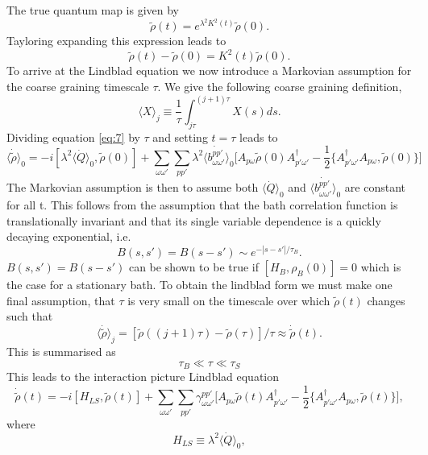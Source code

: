 \documentclass[10pt]{article}
\numberwithin{equation}{section}
\begin{document}
The true quantum map is given by 
\begin{equation}
\tilde{\rho}(t) = e^{\lambda^{2}K^{2}(t)}\tilde{\rho}(0).
\end{equation}
Tayloring expanding this expression leads to 
\begin{equation} \label{eq:7}
\tilde{\rho}(t)-\tilde{\rho}(0) = K^{2}(t)\tilde{\rho}(0).
\end{equation}
To arrive at the Lindblad equation we now introduce a Markovian assumption for the coarse graining timescale $\tau$. We give the following coarse graining definition,
\begin{equation}
\langle X \rangle_{j} \equiv \frac{1}{\tau} \int_{j\tau}^{(j+1)\tau}X(s)ds.
\end{equation}
Dividing equation \ref{eq:7} by $\tau$ and setting $t=\tau$ leads to 
\begin{equation}
\langle \dot{\tilde{\rho}} \rangle_{0} =  -i[\lambda^{2}\langle \dot{Q} \rangle_{0} ,\tilde{\rho}(0)] + \sum_{\omega\omega '}\sum_{pp'}\lambda^{2} \langle \dot{b_{\omega\omega '}^{pp'}} \rangle_{0} \bigg[A_{p\omega}\tilde{\rho}(0)A_{p'\omega '}^{\dagger} - \frac{1}{2}\{A_{p'\omega'}^{\dagger}A_{p\omega},\tilde{\rho}(0)\}\bigg]
\end{equation}
The Markovian assumption is then to assume both $\langle \dot{Q} \rangle_{0}$ and  $\langle \dot{b_{\omega\omega '}^{pp'}} \rangle_{0}$ are constant for all t. This follows from the assumption that the bath correlation function is translationally invariant and that its single variable dependence is a quickly decaying exponential, i.e.
\begin{equation} 
B(s,s') = B(s-s') \sim e^{-|s-s'|/\tau_{B}}.
\end{equation}
$B(s,s') = B(s-s')$ can be shown to be true if $[H_{B},\rho_{B}(0)]=0$ which is the case for a stationary bath. To obtain the lindblad form we must make one final assumption, that $\tau$ is very small on the timescale over which $\tilde{\rho}(t)$ changes such that 
\begin{equation}
\langle \dot{\tilde{\rho}} \rangle_{j} = [\tilde{\rho}((j+1)\tau)-\tilde{\rho}(\tau)]/\tau \approx \dot{\tilde{\rho}}(t).
\end{equation}
This is summarised as 
\begin{equation}
\tau_{B}\ll\tau\ll\tau_{S}
\end{equation}
This leads to the interaction picture Lindblad equation
\begin{equation} \label{eq:10}
 \dot{\tilde{\rho}}(t)=  -i[H_{LS} ,\tilde{\rho}(t)] + \sum_{\omega\omega '}\sum_{pp'}\gamma_{\omega\omega'}^{pp'} \bigg[A_{p\omega}\tilde{\rho}(t)A_{p'\omega '}^{\dagger} - \frac{1}{2}\{A_{p'\omega'}^{\dagger}A_{p\omega},\tilde{\rho}(t)\}\bigg],
\end{equation}
where 
\begin{equation} \label{eq:18}
H_{LS} \equiv \lambda^{2}\langle \dot{Q} \rangle_{0},
\end{equation}
\end{document}
